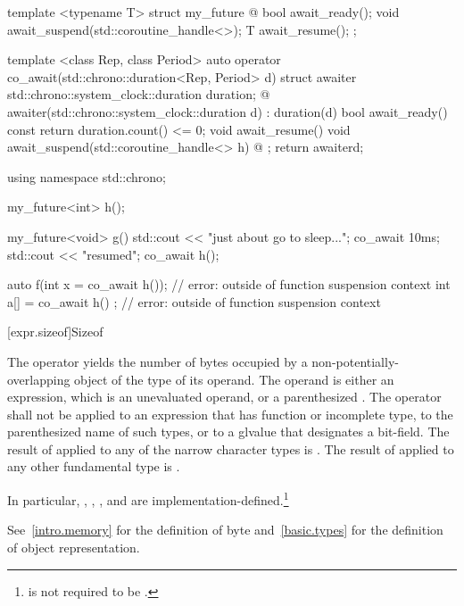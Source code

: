 \pnum
\begin{example}
\begin{codeblock}
template <typename T>
struct my_future {
  @\commentellip@
  bool await_ready();
  void await_suspend(std::coroutine_handle<>);
  T await_resume();
};

template <class Rep, class Period>
auto operator co_await(std::chrono::duration<Rep, Period> d) {
  struct awaiter {
    std::chrono::system_clock::duration duration;
    @\commentellip@
    awaiter(std::chrono::system_clock::duration d) : duration(d) {}
    bool await_ready() const { return duration.count() <= 0; }
    void await_resume() {}
    void await_suspend(std::coroutine_handle<> h) { @\commentellip@ }
  };
  return awaiter{d};
}

using namespace std::chrono;

my_future<int> h();

my_future<void> g() {
  std::cout << "just about go to sleep...\n";
  co_await 10ms;
  std::cout << "resumed\n";
  co_await h();
}

auto f(int x = co_await h());   // error:  outside of function suspension context
int a[] = { co_await h() };     // error:  outside of function suspension context
\end{codeblock}
\end{example}

[expr.sizeof]{Sizeof}

\pnum
{}%
%
%
The  operator yields the number of bytes
occupied by a non-potentially-overlapping object of the type
of its operand. The operand is either an expression,
which is an unevaluated operand, or a parenthesized
.
%
The  operator shall not be applied to an expression that
has function or incomplete type,
to the parenthesized name of such
types, or to a glvalue that designates a bit-field.
The result of 
applied to any of the narrow character types is .
The result of
 applied to any other fundamental
type is .
\begin{note}
In particular, , ,
, and  are
implementation-defined.\footnote{ is not required to be .}
\end{note}
\begin{note}
See~\ref{intro.memory} for the definition of byte
and~\ref{basic.types} for the definition of object representation.
\end{note}

